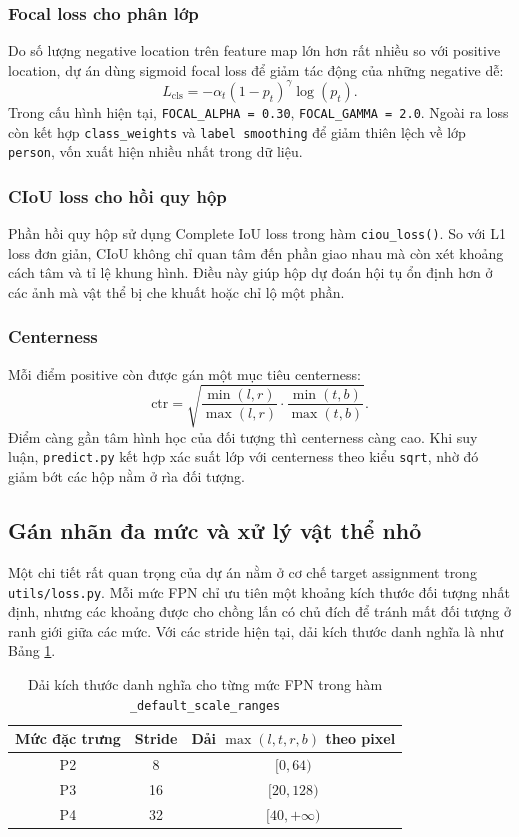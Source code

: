 \documentclass[12pt,a4paper]{article}
\begin{document}
\subsubsection{Focal loss cho phân lớp}
Do số lượng negative location trên feature map lớn hơn rất nhiều so với positive location, dự án dùng sigmoid focal loss để giảm tác động của những negative dễ:
\[
L_{\text{cls}} = -\alpha_t (1-p_t)^{\gamma}\log(p_t).
\]
Trong cấu hình hiện tại, \texttt{FOCAL\_ALPHA = 0.30}, \texttt{FOCAL\_GAMMA = 2.0}. Ngoài ra loss còn kết hợp \texttt{class\_weights} và \texttt{label smoothing} để giảm thiên lệch về lớp \texttt{person}, vốn xuất hiện nhiều nhất trong dữ liệu.

\subsubsection{CIoU loss cho hồi quy hộp}
Phần hồi quy hộp sử dụng Complete IoU loss trong hàm \texttt{ciou\_loss()}. So với L1 loss đơn giản, CIoU không chỉ quan tâm đến phần giao nhau mà còn xét khoảng cách tâm và tỉ lệ khung hình. Điều này giúp hộp dự đoán hội tụ ổn định hơn ở các ảnh mà vật thể bị che khuất hoặc chỉ lộ một phần.

\subsubsection{Centerness}
Mỗi điểm positive còn được gán một mục tiêu centerness:
\[
\text{ctr} = \sqrt{
\frac{\min(l,r)}{\max(l,r)}
\cdot
\frac{\min(t,b)}{\max(t,b)}
}.
\]
Điểm càng gần tâm hình học của đối tượng thì centerness càng cao. Khi suy luận, \texttt{predict.py} kết hợp xác suất lớp với centerness theo kiểu \texttt{sqrt}, nhờ đó giảm bớt các hộp nằm ở rìa đối tượng.

\subsection{Gán nhãn đa mức và xử lý vật thể nhỏ}
Một chi tiết rất quan trọng của dự án nằm ở cơ chế target assignment trong \texttt{utils/loss.py}. Mỗi mức FPN chỉ ưu tiên một khoảng kích thước đối tượng nhất định, nhưng các khoảng được cho chồng lấn có chủ đích để tránh mất đối tượng ở ranh giới giữa các mức. Với các stride hiện tại, dải kích thước danh nghĩa là như Bảng \ref{tab:fpn-ranges}.

\begin{table}[H]
\centering
\caption{Dải kích thước danh nghĩa cho từng mức FPN trong hàm \texttt{\_default\_scale\_ranges}}
\label{tab:fpn-ranges}
\begin{tabular}{ccc}
\toprule
Mức đặc trưng & Stride & Dải $\max(l,t,r,b)$ theo pixel \\
\midrule
P2 & 8 & $[0, 64)$ \\
P3 & 16 & $[20, 128)$ \\
P4 & 32 & $[40, +\infty)$ \\
\bottomrule
\end{tabular}
\end{table}
\end{document}
